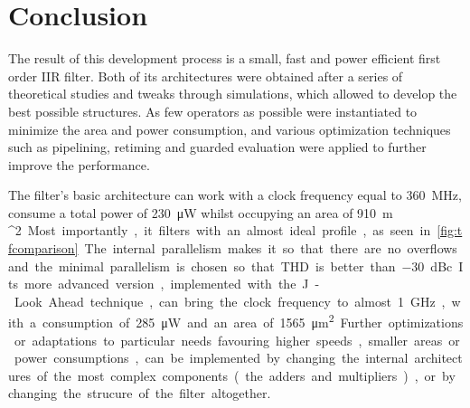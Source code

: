\chapter{Conclusion}
The result of this development process is a small, fast and power efficient first order IIR filter. Both of its architectures were obtained after a series of theoretical studies and tweaks through simulations, which allowed to develop the best possible structures. As few operators as possible were instantiated to minimize the area and power consumption, and various optimization techniques such as pipelining, retiming and guarded evaluation were applied to further improve the performance.

The filter's basic architecture can work with a clock frequency equal to \SI{360}{MHz}, consume a total power of \SI{230}{\micro W} whilst occupying an area of \SI{910}{\micro m ^2}. Most importantly, it filters with an almost ideal profile, as seen in \autoref{fig:tfcomparison}. The internal parallelism makes it so that there are no overflows and the minimal parallelism is chosen so that THD is better than \SI{-30}{dBc}.

Its more advanced version, implemented with the J-Look Ahead technique, can bring the clock frequency to almost \SI{1}{GHz}, with a consumption of \SI{285}{\micro W} and an area of \SI{1565}{\micro m^2}.

Further optimizations or adaptations to particular needs favouring higher speeds, smaller areas or power consumptions, can be implemented by changing the internal architectures of the most complex components (the adders and multipliers), or by changing the strucure of the filter altogether. 
